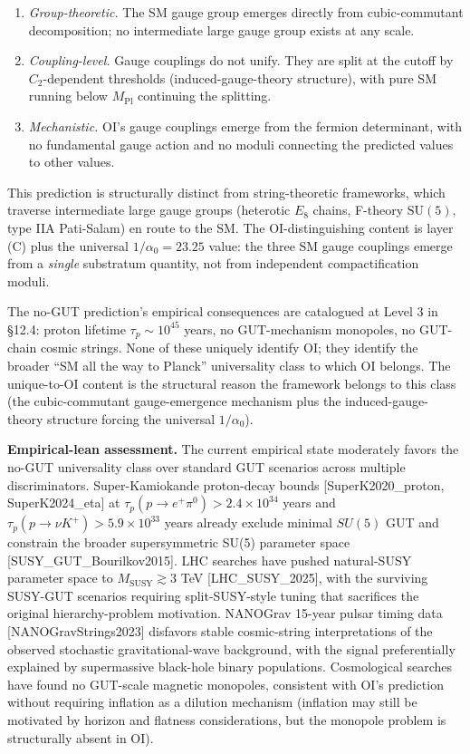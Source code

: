 \documentclass[
]{article}
\begin{document}
\begin{enumerate}
\def\labelenumi{(\Alph{enumi})}
\item
  \emph{Group-theoretic.} The SM gauge group emerges directly from
  cubic-commutant decomposition; no intermediate large gauge group
  exists at any scale.
\item
  \emph{Coupling-level.} Gauge couplings do not unify. They are split at
  the cutoff by \(C_2\)-dependent thresholds (induced-gauge-theory
  structure), with pure SM running below \(M_{\mathrm{Pl}}\) continuing
  the splitting.
\item
  \emph{Mechanistic.} OI's gauge couplings emerge from the fermion
  determinant, with no fundamental gauge action and no moduli connecting
  the predicted values to other values.
\end{enumerate}

This prediction is structurally distinct from string-theoretic
frameworks, which traverse intermediate large gauge groups (heterotic
\(E_8\) chains, F-theory \(\mathrm{SU}(5)\), type IIA Pati-Salam) en
route to the SM. The OI-distinguishing content is layer (C) plus the
universal \(1/\alpha_0 = 23.25\) value: the three SM gauge couplings
emerge from a \emph{single} substratum quantity, not from independent
compactification moduli.

The no-GUT prediction's empirical consequences are catalogued at Level 3
in §12.4: proton lifetime \(\tau_p \sim 10^{45}\) years, no
GUT-mechanism monopoles, no GUT-chain cosmic strings. None of these
uniquely identify OI; they identify the broader ``SM all the way to
Planck'' universality class to which OI belongs. The unique-to-OI
content is the structural reason the framework belongs to this class
(the cubic-commutant gauge-emergence mechanism plus the
induced-gauge-theory structure forcing the universal \(1/\alpha_0\)).

\textbf{Empirical-lean assessment.} The current empirical state
moderately favors the no-GUT universality class over standard GUT
scenarios across multiple discriminators. Super-Kamiokande proton-decay
bounds {[}SuperK2020\_proton, SuperK2024\_eta{]} at
\(\tau_p(p \to e^+\pi^0) > 2.4 \times 10^{34}\) years and
\(\tau_p(p \to \nu K^+) > 5.9 \times 10^{33}\) years already exclude
minimal \(SU(5)\) GUT and constrain the broader supersymmetric SU(5)
parameter space {[}SUSY\_GUT\_Bourilkov2015{]}. LHC searches have pushed
natural-SUSY parameter space to \(M_{\mathrm{SUSY}} \gtrsim 3\) TeV
{[}LHC\_SUSY\_2025{]}, with the surviving SUSY-GUT scenarios requiring
split-SUSY-style tuning that sacrifices the original hierarchy-problem
motivation. NANOGrav 15-year pulsar timing data
{[}NANOGravStrings2023{]} disfavors stable cosmic-string interpretations
of the observed stochastic gravitational-wave background, with the
signal preferentially explained by supermassive black-hole binary
populations. Cosmological searches have found no GUT-scale magnetic
monopoles, consistent with OI's prediction without requiring inflation
as a dilution mechanism (inflation may still be motivated by horizon and
flatness considerations, but the monopole problem is structurally absent
in OI).
\end{document}
